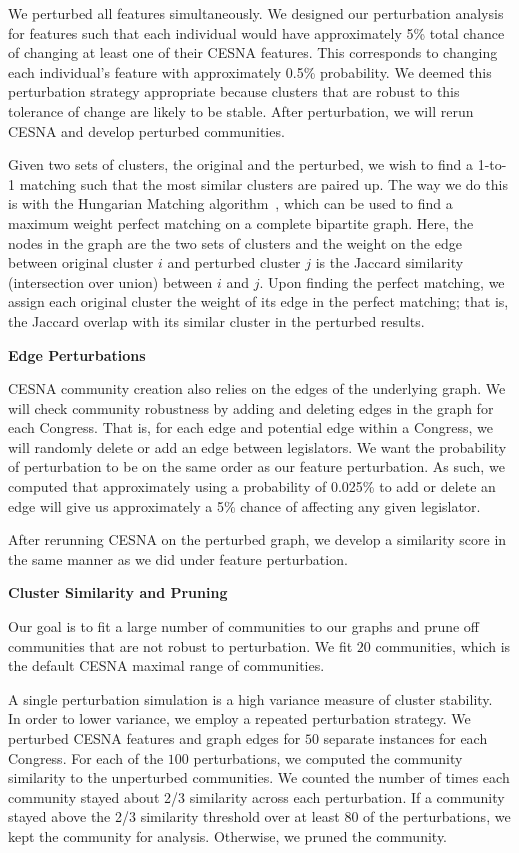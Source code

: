 We perturbed all features simultaneously. We designed our perturbation analysis
for features such that each individual would have approximately 5\% total chance of
changing at least one of their CESNA features. This corresponds to changing each
individual's feature with approximately 0.5\% probability. We deemed this
perturbation strategy appropriate because clusters that are robust to this tolerance of
change are likely to be stable. After perturbation, we will rerun CESNA and
develop perturbed communities.

Given two sets of clusters, the original and the perturbed, we wish to find a
1-to-1 matching such that the most similar clusters are paired up. The way we
do this is with the Hungarian Matching algorithm~\cite{Munkres}, which can be
used to find a maximum weight perfect matching on a complete bipartite graph.
Here, the nodes in the graph are the two sets of clusters and the weight on the
edge between original cluster $i$ and perturbed cluster $j$ is the Jaccard
similarity (intersection over union) between $i$ and $j$. Upon finding the
perfect matching, we assign each original cluster the weight of its edge in the
perfect matching; that is, the Jaccard overlap with its similar cluster in the
perturbed results.

\textbf{Edge Perturbations}

CESNA community creation also relies on the edges of the underlying graph. We
will check community robustness by adding and deleting edges in the graph for
each Congress. That is, for each edge and potential edge within a Congress, we
will randomly delete or add an edge between legislators. We want the
probability of perturbation to be on the same order as our feature perturbation.
As such, we computed that approximately using a probability of 0.025\% to add or
delete an edge will give us approximately a 5\% chance of affecting any given
legislator.

After rerunning CESNA on the perturbed graph, we develop a similarity score in
the same manner as we did under feature perturbation.

\textbf{Cluster Similarity and Pruning}

Our goal is to fit a large number of communities to our graphs and prune off
communities that are not robust to perturbation. We fit $20$ communities, which
is the default CESNA maximal range of communities.

A single perturbation simulation is a high variance measure of cluster
stability.~\cite{Tzerpos} In order to lower variance, we employ a repeated
perturbation strategy. We perturbed CESNA features and graph edges for $50$
separate instances for each Congress. For each of the $100$ perturbations, we
computed the community similarity to the unperturbed communities. We counted the
number of times each community stayed about 2/3 similarity across each
perturbation. If a community stayed above the 2/3 similarity threshold over at
least 80 of the perturbations, we kept the community for analysis. Otherwise, we
pruned the community.


